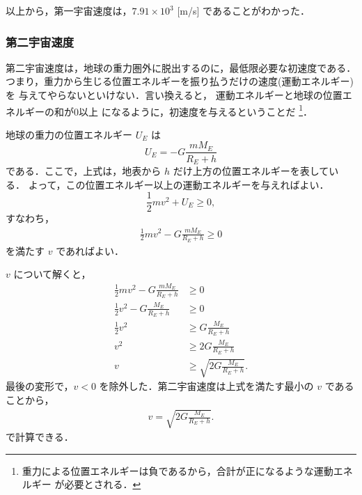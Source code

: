             以上から，第一宇宙速度は，$7.91 \times 10^{3}$ [m/s] であることがわかった．


        \subsubsection{第二宇宙速度}
            第二宇宙速度は，地球の重力圏外に脱出するのに，最低限必要な初速度である．
            つまり，重力から生じる位置エネルギーを振り払うだけの速度(運動エネルギー)を
            与えてやらないといけない．言い換えると，
            運動エネルギーと地球の位置エネルギーの和が0以上
            になるように，初速度を与えるということだ
                \footnote{
                    重力による位置エネルギーは負であるから，合計が正になるような運動エネルギー
                    が必要とされる．
                }．

            地球の重力の位置エネルギー $U_{E}$ は
                \begin{equation*}
                    U_{E}=-G\frac{mM_{E}}{R_{E}+h}
                \end{equation*}
            である．ここで，上式は，地表から $h$ だけ上方の位置エネルギーを表している．
            よって，この位置エネルギー以上の運動エネルギーを与えればよい．
                \begin{equation*}
                    \frac{1}{2}mv^{2} + U_{E} \geq 0,
                \end{equation*}
            すなわち，
                \begin{align}
                    \frac{1}{2}mv^{2} - G\frac{mM_{E}}{R_{E}+h} \geq 0
                \end{align}
            を満たす $v$ であればよい．

            $v$ について解くと，
                \begin{align*}
                    \frac{1}{2}mv^{2} - G\frac{mM_{E}}{R_{E}+h} &\geq 0 \\
                    \frac{1}{2}v^{2}  - G\frac{M_{E}}{R_{E}+h}  &\geq 0 \\
                    \frac{1}{2}v^{2}                        &\geq  G\frac{M_{E}}{R_{E}+h} \\
                               v^{2}                        &\geq 2G\frac{M_{E}}{R_{E}+h} \\
                               v                            &\geq \sqrt{2G\frac{M_{E}}{R_{E}+h}}.
                \end{align*}
            最後の変形で，$v<0$ を除外した．第二宇宙速度は上式を満たす最小の $v$ であることから，
                \begin{align}
                    v = \sqrt{2G\frac{M_{E}}{R_{E}+h}}.
                \end{align}
            で計算できる．

